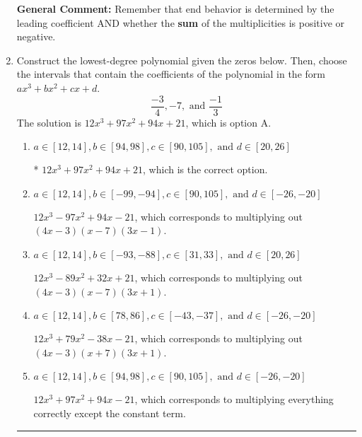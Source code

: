 \documentclass{extbook}[14pt]
\newcommand{\litem}[1]{\item #1

\rule{\textwidth}{0.4pt}}
\begin{document}
\begin{enumerate}
{\textbf{General Comment:} Remember that end behavior is determined by the leading coefficient AND whether the \textbf{sum} of the multiplicities is positive or negative.
}
\litem{
Construct the lowest-degree polynomial given the zeros below. Then, choose the intervals that contain the coefficients of the polynomial in the form $ax^3+bx^2+cx+d$.
\[ \frac{-3}{4}, -7, \text{ and } \frac{-1}{3} \]The solution is \( 12x^{3} +97 x^{2} +94 x + 21 \), which is option A.\begin{enumerate}[label=\Alph*.]
\item \( a \in [12, 14], b \in [94, 98], c \in [90, 105], \text{ and } d \in [20, 26] \)

* $12x^{3} +97 x^{2} +94 x + 21$, which is the correct option.
\item \( a \in [12, 14], b \in [-99, -94], c \in [90, 105], \text{ and } d \in [-26, -20] \)

$12x^{3} -97 x^{2} +94 x -21$, which corresponds to multiplying out $(4x -3)(x -7)(3x -1)$.
\item \( a \in [12, 14], b \in [-93, -88], c \in [31, 33], \text{ and } d \in [20, 26] \)

$12x^{3} -89 x^{2} +32 x + 21$, which corresponds to multiplying out $(4x -3)(x -7)(3x + 1)$.
\item \( a \in [12, 14], b \in [78, 86], c \in [-43, -37], \text{ and } d \in [-26, -20] \)

$12x^{3} +79 x^{2} -38 x -21$, which corresponds to multiplying out $(4x -3)(x + 7)(3x + 1)$.
\item \( a \in [12, 14], b \in [94, 98], c \in [90, 105], \text{ and } d \in [-26, -20] \)

$12x^{3} +97 x^{2} +94 x -21$, which corresponds to multiplying everything correctly except the constant term.
\end{enumerate}

}
\end{enumerate}
\end{document}
